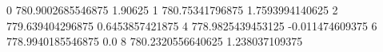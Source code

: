 0 780.9002685546875 1.90625
1 780.75341796875 1.7593994140625
2 779.639404296875 0.6453857421875
4 778.9825439453125 -0.011474609375
6 778.9940185546875 0.0
8 780.2320556640625 1.238037109375
